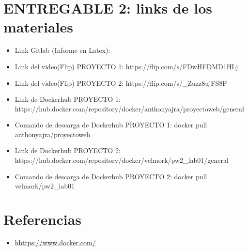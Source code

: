 \documentclass{article}
\begin{document}
\section{ENTREGABLE 2: links de los materiales}
    \begin{itemize}	
    
    \item Link Gitlab (Informe en Latex):
    
    \item Link del video(Flip) PROYECTO 1: https://flip.com/s/FDwHFDMD1HLj
    
    \item Link del video(Flip) PROYECTO 2: https://flip.com/s/_Zuzz8ujFS8F
    
    \item Link de Dockerhub PROYECTO 1: https://hub.docker.com/repository/docker/anthonyajra/proyectoweb/general
    
    \item Comando de descarga de Dockerhub PROYECTO 1:  docker pull anthonyajra/proyectoweb
    
    \item Link de Dockerhub PROYECTO 2: https://hub.docker.com/repository/docker/velmork/pw2_lab01/general
    
    \item Comando de descarga de Dockerhub PROYECTO 2: docker pull velmork/pw2_lab01
\end{itemize}











   
\section{Referencias}
\begin{itemize}			
	\item \url{hhttps://www.docker.com/}
\end{itemize}	
	
%
%
%
			
\end{document}
